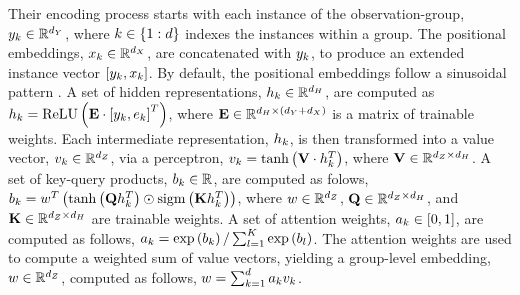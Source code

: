 \documentclass[../thesis.tex]{subfiles}
\begin{document}
Their encoding process starts with each instance of the observation-group, $\myvect{y}_k \in \mathbb{R}^{\mydim{y}}$, where $k \in \left\{1:d\right\}$ indexes the instances within a group. The positional embeddings, $\myvect{x}_k \in \mathbb{R}^{\mydim{x}}$, are concatenated with $y_k$, to produce an extended instance vector $[ y_k, x_k ]$. By default, the positional embeddings follow a sinusoidal pattern \citep{vaswaniAttentionAllYou2017}. A set of hidden representations, $\myvect{h}_k \in \mathbb{R}^{\mydim{h}}$, are computed as $h_k = \mathrm{ReLU} \left( \mathbf{E} \cdot \left[ y_k, e_k \right]^T \right)$, where $\mathbf{E} \in \mathbb{R}^{\mydim{h} \times (\mydim{y} + \mydim{x})}$ is a matrix of trainable weights. Each intermediate representation, $h_k$, is then transformed into a value vector, $\myvect{v}_k \in \mathbb{R}^{\mydim{z}}$, via a perceptron, $v_k = \tanh \left( \mathbf{V} \cdot h_k^T \right)$, where $\mathbf{V} \in \mathbb{R}^{\mydim{z} \times \mydim{h}}$. A set of key-query products, $b_k \in \mathbb{R}$, are computed as folows, $b_k = w^T \left( \tanh \left( \mathbf{Q} h_k^T \right) \odot \mathrm{sigm} \left( \mathbf{K} h_k^T \right) \right)$, where $\myvect{w} \in \mathbb{R}^{\mydim{z}}$, $\mathbf{Q} \in \mathbb{R}^{\mydim{z} \times \mydim{h}}$, and $\mathbf{K} \in \mathbb{R}^{\mydim{z} \times \mydim{h}}$ are trainable weights. A set of attention weights, $a_k \in [0, 1]$, are computed as follows, $a_k = \exp \left( b_k \right) / \sum_{l=1}^{K} \exp \left( b_l \right)$. The attention weights are used to compute a weighted sum of value vectors, yielding a group-level embedding, $\myvect{w} \in \mathbb{R}^{\mydim{z}}$, computed as follows, $w = \sum_{k=1}^{d} a_k v_k$.
\end{document}
